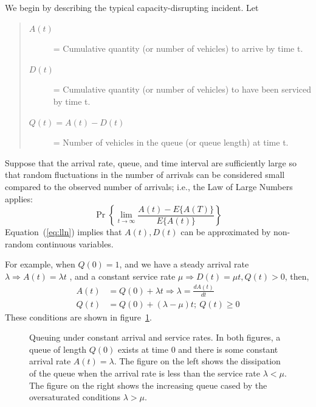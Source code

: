 \documentclass[12pt]{report}
\newcommand{\inputTikZ}[1]{%
  }
\newcommand{\inputTikZ}[1]{%
    \beginpgfgraphicnamed{#1-external}%
    \endpgfgraphicnamed%
  }
\begin{document}
We begin by describing the typical capacity-disrupting incident. Let
\begin{quote}
\begin{description}
\item[$A(t)$] = Cumulative quantity (or number of vehicles) to arrive
  by time t.
\item[$D(t)$] = Cumulative quantity (or number of vehicles) to have
  been serviced by time t.
\item[$Q(t)=A(t)-D(t)$] = Number of vehicles in the queue (or queue
  length) at time t.
\end{description}
\end{quote}
Suppose that the arrival rate, queue, and time interval are
sufficiently large so that random fluctuations in the number of
arrivals can be considered small compared to the observed number of
arrivals; i.e., the Law of Large Numbers applies:
\begin{equation}
  \label{eq:lln}
  \Pr\left\{\lim_{t\to\infty}\frac{A(t)-E\{A(T)\}}{E\{A(t)\}}\right\} 
\end{equation}
Equation~(\ref{eq:lln}) implies that $A(t), D(t)$ can be approximated by
non-random continuous variables.

For example, when $Q(0)=1$, and we have a steady arrival rate $\lambda
\Rightarrow A(t) = \lambda t$ , and a constant service rate $\mu \Rightarrow D(t)
= \mu t, Q(t)>0$, then, 
\begin{align*}
  \label{eq:arrival-and-queues}
  A(t) & = Q(0) + \lambda t \Rightarrow \lambda = \frac{dA(t)}{dt}\\
  Q(t) & = Q(0) + (\lambda - \mu ) t; \: Q(t) \ge 0
\end{align*}
These conditions are shown in figure~\ref{fig:queuing-constant-rates}.
\begin{figure}[tbp]
  \begin{center}
    \inputTikZ{figs/queuing-undersat-and-oversat}
    \caption[Queuing under constant arrival and service rates]{Queuing
      under constant arrival and service rates.  In both figures, a
      queue of length $Q(0)$ exists at time 0 and there is some
      constant arrival rate $A(t)=\lambda$.  The figure on the left
      shows the dissipation of the queue when the arrival rate is less
      than the service rate $\lambda<\mu$.  The figure on the right
      shows the increasing queue cased by the oversaturated conditions
      $\lambda>\mu$.}
    \label{fig:queuing-constant-rates}
  \end{center}
\end{figure}
 
\end{document}
